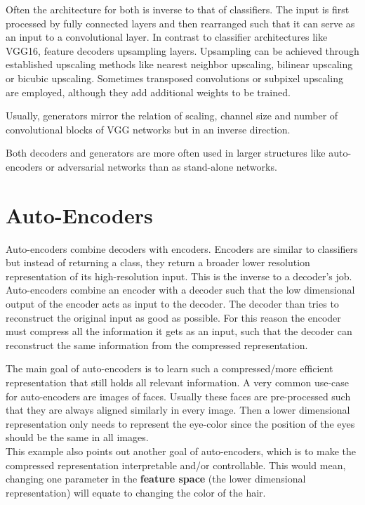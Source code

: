 Often the architecture for both is inverse to that of classifiers.
The input is first processed by fully connected layers and then rearranged such that it can serve as an input to a convolutional layer.
In contrast to classifier architectures like VGG16, feature decoders upsampling layers.
Upsampling can be achieved through established upscaling methods like nearest neighbor upscaling, bilinear upscaling or bicubic upscaling.
Sometimes transposed convolutions or subpixel upscaling are employed, although they add additional weights to be trained.

Usually, generators mirror the relation of scaling, channel size and number of convolutional blocks of VGG networks but in an inverse direction.

Both decoders and generators are more often used in larger structures like auto-encoders or adversarial networks than as stand-alone networks.

\section{Auto-Encoders}
Auto-encoders combine decoders with encoders.
Encoders are similar to classifiers but instead of returning a class, they return a broader lower resolution representation of its high-resolution input.
This is the inverse to a decoder's job.
Auto-encoders combine an encoder with a decoder such that the low dimensional output of the encoder acts as input to the decoder.
The decoder than tries to reconstruct the original input as good as possible.
For this reason the encoder must compress all the information it gets as an input, such that the decoder can reconstruct the same information from the compressed representation.

The main goal of auto-encoders is to learn such a compressed/more efficient representation that still holds all relevant information.
A very common use-case for auto-encoders are images of faces.
Usually these faces are pre-processed such that they are always aligned similarly in every image.
Then a lower dimensional representation only needs to represent \eg the eye-color since the position of the eyes should be the same in all images.\\
This example also points out another goal of auto-encoders, which is to make the compressed representation interpretable and/or controllable.
This would mean, changing one parameter in the \textbf{feature space} (the lower dimensional representation) will equate to changing the color of the hair.

